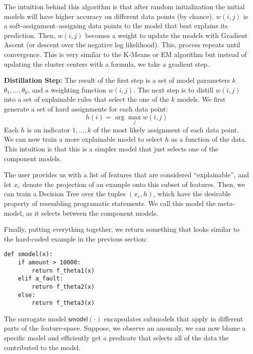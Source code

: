 The intuition behind this algorithm is that after random initialization the initial models will have higher accuracy on different data points (by chance). $w(i,j)$ is a soft-assignment--assigning data points to the model that best explains its prediction. Then, $w(i,j)$ becomes a weight to update the models with Gradient Ascent (or descent over the negative log likelihood). This, process repeats until convergence. This is very similar to the K-Means or EM algorithm but instead of updating the cluster centers with a formula, we take a gradient step.

\vspace{0.5em} \noindent \textbf{Distillation Step: } The result of the first step is a set of model parameters $k$ $\theta_1,...,\theta_k$, and a weighting function $w(i,j)$. The next step is to distill $w(i,j)$ into a set of explainable rules that select the one of the $k$ models. We first generate a set of hard assignments for each data point:
\[
h(i) = \arg\max_{j} w(i,j)
\]
Each $h$ is an indicator $1,...,k$ of the most likely assignment of each data point.
We can now train a more explainable model to select $h$ as a function of the data.
This intuition is that this is a simpler model that just selects one of the component models.

The user provides us with a list of features that are considered ``explainable'', and let $x_e$ denote the projection of an example onto this subset of features.
Then, we can train a Decision Tree over the tuples $(x_e, h)$, which have the desirable property of resembling programatic statements.
We call this model the meta-model, as it selects between the component models.

Finally, putting everything together, we return something that looks similar to the hard-coded example in the previous section:
\begin{lstlisting}
def smodel(x):
    if amount > 10000:
        return f_theta1(x)
    elif a_fault:
        return f_theta2(x)
    else:
        return f_theta3(x)
\end{lstlisting}
The surrogate model $\textsf{smodel}(\cdot)$ encapsulates submodels that apply in different parts of the feature-space.
Suppose, we observe an anomaly, we can now blame a specific model and efficiently get a predicate that selects all of the data the contributed to the model.